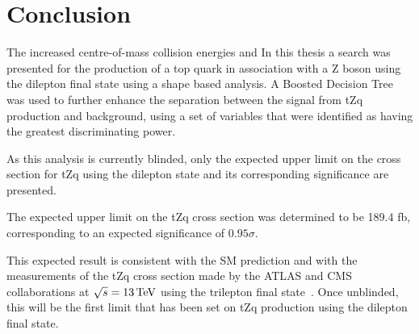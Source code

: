 \chapter{Conclusion}\label{chapter:conclusion}
The increased centre-of-mass collision energies and 
In this thesis a search was presented for the production of a top quark in association with a Z boson using the dilepton final state using a shape based analysis.
A Boosted Decision Tree was used to further enhance the separation between the signal from tZq production and background, using a set of variables that were identified as having the greatest discriminating power.

As this analysis is currently blinded, only the expected upper limit on the cross section for tZq using the dilepton state and its corresponding significance are presented.

The expected upper limit on the tZq cross section was determined to be 189.4 fb, corresponding to an expected significance of $0.95 \sigma$.

This expected result is consistent with the SM prediction and with the measurements of the tZq cross section made by the ATLAS and CMS collaborations at $\sqrt{s} = 13 \,\text{Te\hspace{-.08em}V}$ using the trilepton final state~\cite{Aaboud:2017ylb,Sirunyan:2017nbr}.  
Once unblinded, this will be the first limit that has been set on tZq production using the dilepton final state.

%
%


